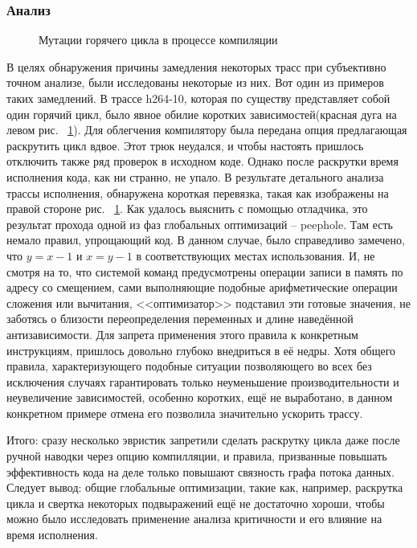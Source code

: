 \documentclass[a4paper,12pt,titlepage]{article}
\newcommand*{\fig}[1]{рис. ~{\ref{fig:#1}}}
\begin{document}
\subsubsection{Анализ}
\begin{figure}[h]

\caption{Мутации горячего цикла в процессе компиляции}
\label{fig:h264-10}
\end{figure}
В целях обнаружения причины замедления некоторых трасс при субъективно точном анализе, были исследованы некоторые из них. Вот один из примеров таких замедлений. В трассе h264-10, которая по существу представляет собой один горячий цикл, было явное обилие коротких зависимостей(красная дуга на левом \fig{h264-10}). Для облегчения компилятору была передана опция предлагающая раскрутить цикл вдвое. Этот трюк неудался, и чтобы настоять пришлось отключить также ряд проверок в исходном коде. Однако после раскрутки время исполнения кода, как ни странно, не упало. В результате детального анализа трассы исполнения, обнаружена короткая перевязка, такая как изображены на правой стороне \fig{h264-10}. Как удалось выяснить с помощью отладчика, это результат прохода одной из фаз глобальных оптимизаций -- peephole. Там есть немало правил, упрощающий код. В данном случае, было справедливо замечено, что $y=x-1$ и $x=y-1$ в соответствующих местах использования. И, не смотря на то, что системой команд предусмотрены операции записи в память по адресу со смещением, сами выполняющие подобные арифметические операции сложения или вычитания, <<оптимизатор>> подставил эти готовые значения, не заботясь о близости переопределения переменных и длине наведённой антизависимости. Для запрета применения этого правила к конкретным инструкциям, пришлось довольно глубоко внедриться в её недры. Хотя общего правила, характеризующего подобные ситуации позволяющего во всех без исключения случаях гарантировать только неуменьшение производительности и неувеличение зависимостей, особенно коротких, ещё не выработано, в данном конкретном примере отмена его позволила значительно ускорить трассу.

Итого: сразу несколько эвристик запретили сделать раскрутку цикла даже после ручной наводки через опцию компилляции, и правила, призванные повышать эффективность кода на деле только повышают связность графа потока данных. Следует вывод: общие глобальные оптимизации, такие как, например, раскрутка цикла и свертка некоторых подвыражений ещё не достаточно хороши, чтобы можно было исследовать применение анализа критичности и его влияние на время исполнения.
\end{document}
